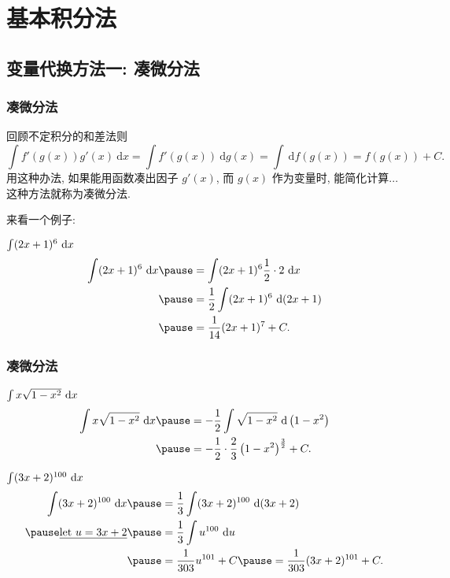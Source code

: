 \documentclass[
10pt,
aspectratio=43,
]{beamer}
\begin{document}
\section{基本积分法}

\subsection{变量代换方法一: 凑微分法}


\begin{frame}
	\frametitle{凑微分法}
	\everymath{\displaystyle}
	回顾不定积分的和差法则
	$$
		\int f'(g(x))g'(x)\mathrm{~d}x=\int f'(g(x))\mathrm{~d}g(x)=\int \mathrm{~d}f(g(x))= f(g(x))+C.
	$$
	\pause
	用这种办法, 如果能用函数凑出因子 $g'(x)$, 而 $g(x)$ 作为变量时, 能简化计算...这种方法就称为凑微分法.
	\vspace{0.3cm}

	来看一个例子:
	\pause
	\vspace{0.1cm}
	\begin{exampleblock}{$\color{black}\int(2 x+1)^6 \mathrm{~d} x$}
		$$
			\begin{aligned}
				\int(2 x+1)^6 \mathrm{~d} x & \pause=  \int(2 x+1)^6 \frac{1}{2}\cdot 2 \mathrm{~d} x \\
				                            & \pause=  \frac{1}{2}\int(2 x+1)^6 \mathrm{~d} (2x+1)    \\
				                            & \pause= \frac{1}{14}(2x+1)^7+C.
			\end{aligned}
		$$
	\end{exampleblock}

\end{frame}

\begin{frame}
	\frametitle{凑微分法}
	\everymath{\displaystyle}
	\begin{exampleblock}{$\color{black}\int x \sqrt{1-x^2} \mathrm{~d} x$}
		$$
			\begin{aligned}
				\int x \sqrt{1-x^2} \mathrm{~d} x & \pause= -\frac{1}{2} \int \sqrt{1-x^2} \mathrm{~d}\left(1-x^2\right)      \\
				                                  & \pause= -\frac{1}{2} \cdot \frac{2}{3}\left(1-x^2\right)^{\frac{3}{2}}+C.
			\end{aligned}
		$$
	\end{exampleblock}
	\pause
	\begin{exampleblock}{$\color{black}\int (3x+2)^{100} \mathrm{~d}x$}
		$$
			\begin{aligned}
				\int (3x+2)^{100} \mathrm{~d}x      & \pause= \frac{1}{3} \int (3x+2)^{100} \mathrm{~d}(3x+2)               \\
				\pause\underline{\text{let }u=3x+2} & \pause=  \frac{1}{3} \int u^{100} \mathrm{~d}u                        \\
				                                    & \pause= \frac{1}{303} u^{101}+C \pause = \frac{1}{303}(3x+2)^{101}+C.
			\end{aligned}
		$$
	\end{exampleblock}
\end{frame}
\end{document}
